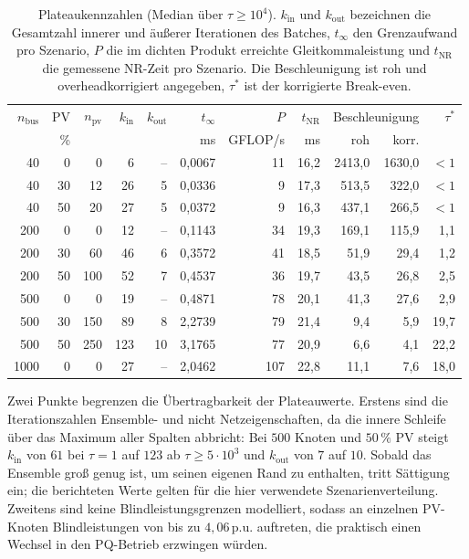 \begin{table}[htbp]
	\centering
	\small
	\caption{Plateaukennzahlen (Median über $\tau\ge10^4$). $k_\mathrm{in}$ und
		$k_\mathrm{out}$ bezeichnen die Gesamtzahl innerer und äußerer
		Iterationen des Batches, $t_\infty$ den Grenzaufwand pro Szenario, $P$ die
		im dichten Produkt erreichte Gleitkommaleistung und $t_\mathrm{NR}$ die
		gemessene NR-Zeit pro Szenario. Die Beschleunigung ist roh und
		overheadkorrigiert angegeben, $\tau^\ast$ ist der korrigierte Break-even.}
	\label{tab:batch_plateau}
	\begin{tabular}{rrrrrrrrrrr}
		\toprule
		$n_\mathrm{bus}$ & PV & $n_\mathrm{pv}$ & $k_\mathrm{in}$ &
		$k_\mathrm{out}$ & $t_\infty$ & $P$ & $t_\mathrm{NR}$ &
		\multicolumn{2}{c}{Beschleunigung} & $\tau^\ast$ \\
		& \% & & & & ms & GFLOP/s & ms & roh & korr. & \\
		\midrule
		40   & 0  & 0   & 6   & --  & 0{,}0067 & 11  & 16{,}2 & 2413{,}0 & 1630{,}0 & $<1$ \\
		40   & 30 & 12  & 26  & 5   & 0{,}0336 & 9   & 17{,}3 & 513{,}5  & 322{,}0  & $<1$ \\
		40   & 50 & 20  & 27  & 5   & 0{,}0372 & 9   & 16{,}3 & 437{,}1  & 266{,}5  & $<1$ \\
		\midrule
		200  & 0  & 0   & 12  & --  & 0{,}1143 & 34  & 19{,}3 & 169{,}1  & 115{,}9  & 1{,}1 \\
		200  & 30 & 60  & 46  & 6   & 0{,}3572 & 41  & 18{,}5 & 51{,}9   & 29{,}4   & 1{,}2 \\
		200  & 50 & 100 & 52  & 7   & 0{,}4537 & 36  & 19{,}7 & 43{,}5   & 26{,}8   & 2{,}5 \\
		\midrule
		500  & 0  & 0   & 19  & --  & 0{,}4871 & 78  & 20{,}1 & 41{,}3   & 27{,}6   & 2{,}9 \\
		500  & 30 & 150 & 89  & 8   & 2{,}2739 & 79  & 21{,}4 & 9{,}4    & 5{,}9    & 19{,}7 \\
		500  & 50 & 250 & 123 & 10  & 3{,}1765 & 77  & 20{,}9 & 6{,}6    & 4{,}1    & 22{,}2 \\
		\midrule
		1000 & 0  & 0   & 27  & --  & 2{,}0462 & 107 & 22{,}8 & 11{,}1   & 7{,}6    & 18{,}0 \\
		\bottomrule
	\end{tabular}
\end{table}

Zwei Punkte begrenzen die Übertragbarkeit der Plateauwerte. Erstens sind die
Iterationszahlen Ensemble- und nicht Netzeigenschaften, da die innere Schleife
über das Maximum aller Spalten abbricht: Bei $500$ Knoten und $50\,\%$ PV
steigt $k_\mathrm{in}$ von $61$ bei $\tau=1$ auf $123$ ab $\tau\ge5\cdot10^3$
und $k_\mathrm{out}$ von $7$ auf $10$. Sobald das Ensemble groß genug ist, um
seinen eigenen Rand zu enthalten, tritt Sättigung ein; die berichteten Werte
gelten für die hier verwendete Szenarienverteilung. Zweitens sind keine
Blindleistungsgrenzen modelliert, sodass an einzelnen PV-Knoten
Blindleistungen von bis zu $4{,}06\,\text{p.u.}$ auftreten, die praktisch einen
Wechsel in den PQ-Betrieb erzwingen würden.

